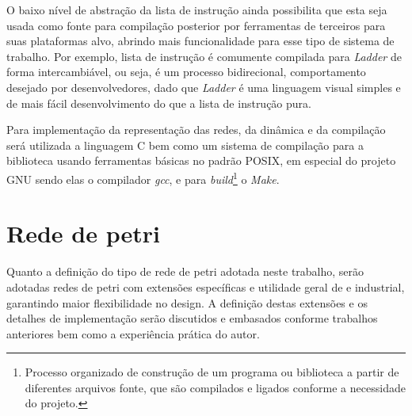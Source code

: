 O baixo nível de abstração da lista de instrução ainda possibilita que esta seja usada como fonte para compilação posterior por ferramentas de terceiros para suas plataformas alvo, abrindo mais funcionalidade para esse tipo de sistema de trabalho. Por exemplo, lista de instrução é comumente compilada para \textit{Ladder} de forma intercambiável, ou seja, é um processo bidirecional, comportamento desejado por desenvolvedores, dado que \textit{Ladder} é uma linguagem visual simples e de mais fácil desenvolvimento do que a lista de instrução pura.

Para implementação da representação das redes, da dinâmica e da compilação será utilizada a linguagem C bem como um sistema de compilação para a biblioteca usando ferramentas básicas no padrão POSIX\nocite{posix}, em especial do projeto GNU \cite{gnu} sendo elas o compilador \textit{gcc}, e para \textit{build}\footnote{Processo organizado de construção de um programa ou biblioteca a partir de diferentes arquivos fonte, que são compilados e ligados conforme a necessidade do projeto.} o \textit{Make}.




\section{Rede de petri}

Quanto a definição do tipo de rede de petri adotada neste trabalho, serão adotadas redes de petri com extensões específicas e utilidade geral de e industrial, garantindo maior flexibilidade no design. A definição destas extensões e os detalhes de implementação serão discutidos e embasados conforme trabalhos anteriores bem como a experiência prática do autor.


